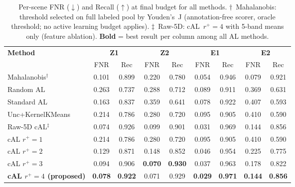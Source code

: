 \documentclass[lettersize,journal]{IEEEtran}
\begin{document}
\begin{table}[t]
\footnotesize
\centering
\caption{Per-scene FNR ($\downarrow$) and Recall ($\uparrow$) at final budget for all methods.
         $\dagger$~Mahalanobis: threshold selected on full labeled pool by Youden's~J
         (annotation-free scorer, oracle threshold; no active learning budget applies).
         $\ddagger$~Raw-5D: cAL~$r^{+}=4$ with 5-band means only (feature ablation).
         \textbf{Bold} = best result per column among all AL methods.}
\begin{tabular}{l c c c c c c c c}
    \toprule
    \multirow{2}{*}{\textbf{Method}}
        & \multicolumn{2}{c}{\textbf{Z1}}
        & \multicolumn{2}{c}{\textbf{Z2}}
        & \multicolumn{2}{c}{\textbf{E1}}
        & \multicolumn{2}{c}{\textbf{E2}} \\
    \cmidrule(lr){2-3}\cmidrule(lr){4-5}\cmidrule(lr){6-7}\cmidrule(lr){8-9}
        & FNR & Rec & FNR & Rec & FNR & Rec & FNR & Rec \\
    \midrule
    Mahalanobis$^\dagger$
        & 0.101 & 0.899 & 0.220 & 0.780 & 0.054 & 0.946 & 0.079 & 0.921 \\
    \midrule
    Random AL
        & 0.263 & 0.737 & 0.288 & 0.712 & 0.089 & 0.911 & 0.369 & 0.631 \\
    Standard AL
        & 0.163 & 0.837 & 0.359 & 0.641 & 0.078 & 0.922 & 0.407 & 0.593 \\
    Unc+KernelKMeans
        & 0.214 & 0.786 & 0.280 & 0.720 & 0.095 & 0.905 & 0.410 & 0.590 \\
    Raw-5D cAL$^\ddagger$
        & 0.074 & 0.926 & 0.099 & 0.901 & 0.031 & 0.969 & 0.144 & 0.856 \\
    \midrule
    cAL $r^{+}=1$
        & 0.214 & 0.786 & 0.280 & 0.720 & 0.095 & 0.905 & 0.410 & 0.590 \\
    cAL $r^{+}=2$
        & 0.129 & 0.871 & 0.148 & 0.852 & 0.046 & 0.954 & 0.225 & 0.775 \\
    cAL $r^{+}=3$
        & 0.094 & 0.906 & \textbf{0.070} & \textbf{0.930} & 0.037 & 0.963 & 0.178 & 0.822 \\
    \textbf{cAL $r^{+}=4$ (proposed)}
        & \textbf{0.078} & \textbf{0.922} & 0.071 & 0.929
        & \textbf{0.029} & \textbf{0.971} & \textbf{0.144} & \textbf{0.856} \\
    \bottomrule
\end{tabular}
\label{tab:confusion_scene}
\end{table}
\end{document}
